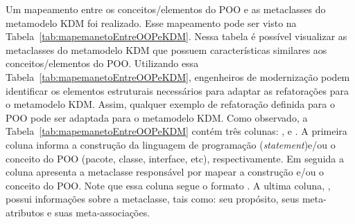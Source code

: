 Um mapeamento entre os conceitos/elementos do POO e as metaclasses do metamodelo KDM foi realizado. Esse mapeamento pode ser visto na Tabela~\ref{tab:mapemanetoEntreOOPeKDM}. Nessa tabela é possível visualizar as metaclasses do metamodelo KDM que possuem características similares aos conceitos/elementos do POO. Utilizando essa Tabela~\ref{tab:mapemanetoEntreOOPeKDM}, engenheiros de modernização podem identificar os elementos estruturais necessários para adaptar as refatorações para o metamodelo KDM. Assim, qualquer exemplo de refatoração definida para o POO pode ser adaptada para o metamodelo KDM. Como observado, a Tabela~\ref{tab:mapemanetoEntreOOPeKDM} contém três colunas: ,  e . A primeira coluna informa a construção da linguagem de programação (\textit{statement})e/ou o conceito do POO (pacote, classe, interface, etc), respectivamente. Em seguida a coluna  apresenta a metaclasse responsável por mapear a construção e/ou o conceito do POO. Note que essa coluna segue o formato . A ultima coluna, , possui informações sobre a metaclasse, tais como: seu propósito, seus meta-atributos e suas meta-associações.

